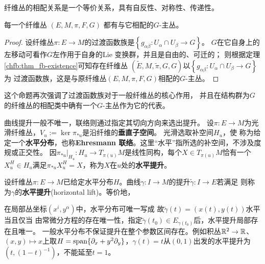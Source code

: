 纤维丛的相配关系是一个等价关系，具有自反性、对称性、传递性。

\begin{proposition}
    每一个纤维丛 $(E, M, \pi, F, G)$ 都有与它相配的$G$-主丛。
\end{proposition}
\begin{proof}
    设纤维丛$\pi: E \rightarrow M$的过渡函数族是$\left\{g_{\alpha \beta}: U_\alpha \cap U_\beta \rightarrow G\right\}$。
    $G$在它自身上的左移动可看作$G$左作用于自身的Lie 变换群，并且是自由的、可迁的；
    则根据定理\ref{chfb:thm_fb-existence}可知存在纤维丛
    $(\widetilde{E}, M, \tilde{\pi},G, G)$以$\left\{g_{\alpha \beta}: U_\alpha \cap U_\beta \rightarrow G\right\}$为
    过渡函数族，这是与原纤维丛$(E, M, \pi, F, G)$相配的$G$-主丛。
\end{proof}

这个命题再次强调了过渡函数族对于一般纤维丛的核心作用，
并且在结构群为$G$的纤维丛的相配类中确有一个$G$-主丛作为它的代表。

曲线提升一般不唯一，联络则通过指定其切向方向来选出提升。
设$\pi:E\to M$为光滑纤维丛，$V_u:=\ker\pi_{*u}$是沿纤维的\textbf{垂直子空间}。
光滑选取补空间$H_u$，使
称为给定一个\textbf{水平分布}，也称\textbf{Ehresmann 联络}。这里“水平”指所选的补空间，不涉及度规或正交性。
因$\pi_{*u}|_{H_u}:H_u\to T_{\pi(u)}M$是线性同构，每个$X\in T_{\pi(u)}M$恰有一个$X_u^H\in H_u$满足$\pi_{*u}X_u^H=X$，称为$X$在$u$处的\textbf{水平提升}。

\begin{definition}\label{chfb:def_horizontal-lift}
    设纤维丛$\pi:E\to M$已给定水平分布$H$。曲线$\gamma:I\to M$的提升$\widetilde\gamma:I\to E$若满足
    则称为$\gamma$的\textbf{水平提升}(horizontal lift)。等价地，
\end{definition}

在局部丛坐标$(x^i,y^\alpha)$中，水平分布可唯一写成
故$\widetilde\gamma(t)=(x(t),y(t))$水平当且仅当
由常微分方程的存在唯一性，指定$\widetilde\gamma(t_0)\in E_{\gamma(t_0)}$后，水平提升局部存在且唯一。
一般水平分布不保证提升在整个参数区间存在。例如积丛$\mathbb{R}^2\to\mathbb{R}$、$(x,y)\mapsto x$上取$H=\operatorname{span}\{\partial_x+y^2\partial_y\}$，$\gamma(t)=t$从$(0,1)$出发的水平提升为$(t,(1-t)^{-1})$，不能延至$t=1$。

